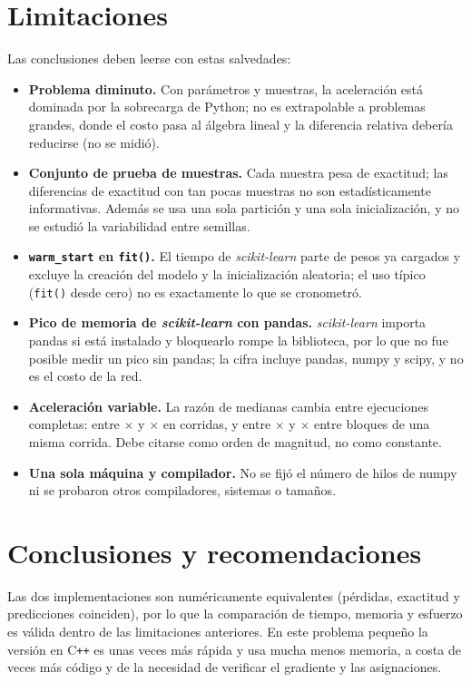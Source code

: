 \documentclass[11pt,a4paper]{article}
\newcommand{\cpp}{C\texttt{++}\xspace}
\newcommand{\sk}{\textit{scikit-learn}\xspace}
\begin{document}
\section{Limitaciones}
Las conclusiones deben leerse con estas salvedades:
\begin{itemize}
\item \textbf{Problema diminuto.} Con \nParams{} par\'ametros y \nTrain{} muestras, la aceleraci\'on est\'a dominada por la sobrecarga de Python; no es extrapolable a problemas grandes, donde el costo pasa al \'algebra lineal y la diferencia relativa deber\'ia reducirse (no se midi\'o).
\item \textbf{Conjunto de prueba de \nTest{} muestras.} Cada muestra pesa \testSamplePct{} de exactitud; las diferencias de exactitud con tan pocas muestras no son estad\'isticamente informativas. Adem\'as se usa una sola partici\'on y una sola inicializaci\'on, y no se estudi\'o la variabilidad entre semillas.
\item \textbf{\texttt{warm\_start} en \texttt{fit()}.} El tiempo de \sk parte de pesos ya cargados y excluye la creaci\'on del modelo y la inicializaci\'on aleatoria; el uso t\'ipico (\texttt{fit()} desde cero) no es exactamente lo que se cronometr\'o.
\item \textbf{Pico de memoria de \sk con pandas.} \sk \envSklearn{} importa pandas si est\'a instalado y bloquearlo rompe la biblioteca, por lo que no fue posible medir un pico sin pandas; la cifra incluye pandas, numpy y scipy, y no es el costo de la red.
\item \textbf{Aceleraci\'on variable.} La raz\'on de medianas cambia entre ejecuciones completas: entre \speedupHistMin{}$\times$ y \speedupHistMax{}$\times$ en \nHistoryRuns{} corridas, y entre \speedupBlockMin{}$\times$ y \speedupBlockMax{}$\times$ entre bloques de una misma corrida. Debe citarse como orden de magnitud, no como constante.
\item \textbf{Una sola m\'aquina y compilador.} No se fij\'o el n\'umero de hilos de numpy ni se probaron otros compiladores, sistemas o tama\~nos.
\end{itemize}

\section{Conclusiones y recomendaciones}
Las dos implementaciones son num\'ericamente equivalentes (p\'erdidas, exactitud y predicciones coinciden), por lo que la comparaci\'on de tiempo, memoria y esfuerzo es v\'alida dentro de las limitaciones anteriores. En este problema peque\~no la versi\'on en \cpp es unas \speedupMedian{} veces m\'as r\'apida y usa mucha menos memoria, a costa de \locRatio{} veces m\'as c\'odigo y de la necesidad de verificar el gradiente y las asignaciones.
\end{document}
